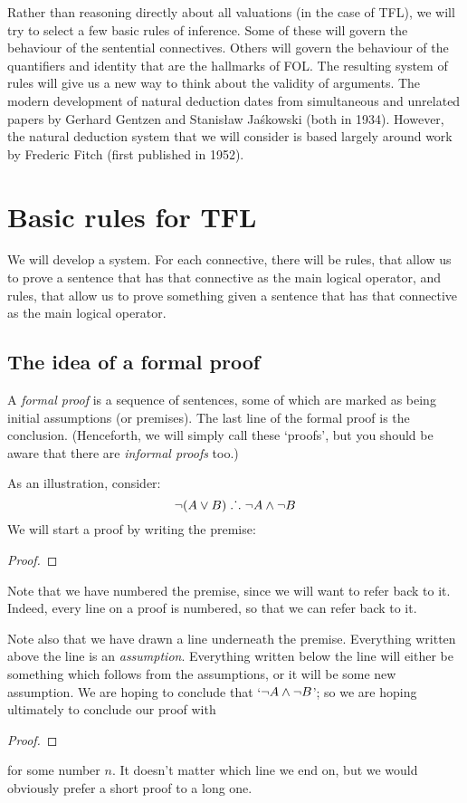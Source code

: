 Rather than reasoning directly about all valuations (in the case of TFL), we will try to select a few basic rules of inference. Some of these will govern the behaviour of the sentential connectives. Others will govern the behaviour of the quantifiers and identity that are the hallmarks of FOL. The resulting system of rules will give us a new way to think about the validity of arguments. 
The modern development of natural deduction dates from simultaneous and unrelated papers by Gerhard Gentzen and Stanis\l{}aw Ja\'{s}kowski (both in 1934). However, the natural deduction system that we will consider is based largely around work by Frederic Fitch (first published in 1952). 



\chapter{Basic rules for TFL}\label{s:BasicTFL}
We will develop a  system. For each connective, there will be  rules, that allow us to prove a sentence that has that connective as the main logical operator, and  rules, that allow us to prove something given a sentence that has that connective as the main logical operator.

\section{The idea of a formal proof}
A \emph{formal proof} is a sequence of sentences, some of which are marked as being initial assumptions (or premises). The last line of the formal proof is the conclusion. (Henceforth, we will simply call these `proofs', but you should be aware that there are \emph{informal proofs} too.)

As an illustration, consider:
	$$\neg (A \vee B) \mathrel{\ldotp\dot{}\,\ldotp} \neg A \wedge \neg B$$
We will start a proof by writing the premise:
\begin{proof}
\end{proof}
Note that we have numbered the premise, since we will want to refer back to it. Indeed, every line on a proof is numbered, so that we can refer back to it. 

Note also that we have drawn a line underneath the premise. Everything written above the line is an \emph{assumption}. Everything written below the line will either be something which follows from the assumptions, or it will be some new assumption. We are hoping to conclude that `$\neg A \wedge \neg B$'; so we are hoping ultimately to conclude our proof with
\begin{proof}
\end{proof}
for some number $n$. It doesn't matter which line we end on, but we would obviously prefer a short proof to a long one.

